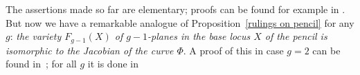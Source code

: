 The assertions made so far are elementary; proofs can be found for example in \cite{First Course book}. But now we have a remarkable analogue of Proposition~\ref{rulings on pencil} for any $g$: \emph{the variety $F_{g-1}(X)$ of $g-1$-planes in the base locus $X$ of the pencil is isomorphic to the Jacobian of the  curve $\Phi$}. A proof of this in case $g=2$ can be found in~\cite{Griffiths-Harris}; for all $g$ it is done in~\cite{Donagi paper}





